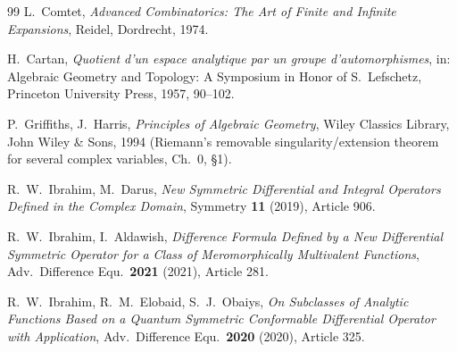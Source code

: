 \documentclass[11pt]{article}
\theoremstyle{remark}
\begin{document}
\begin{thebibliography}{99}
 L.\ Comtet, \emph{Advanced Combinatorics: The Art of Finite and Infinite Expansions}, Reidel, Dordrecht, 1974.

 H.\ Cartan, \emph{Quotient d'un espace analytique par un groupe d'automorphismes}, in: Algebraic Geometry and Topology: A Symposium in Honor of S.\ Lefschetz, Princeton University Press, 1957, 90--102.

 P.\ Griffiths, J.\ Harris, \emph{Principles of Algebraic Geometry}, Wiley Classics Library, John Wiley \& Sons, 1994 (Riemann's removable singularity/extension theorem for several complex variables, Ch.~0, \S1).

 R.\ W.\ Ibrahim, M.\ Darus, \emph{New Symmetric Differential and Integral Operators Defined in the Complex Domain}, Symmetry \textbf{11} (2019), Article 906.

 R.\ W.\ Ibrahim, I.\ Aldawish, \emph{Difference Formula Defined by a New Differential Symmetric Operator for a Class of Meromorphically Multivalent Functions}, Adv.\ Difference Equ.\ \textbf{2021} (2021), Article 281.

 R.\ W.\ Ibrahim, R.\ M.\ Elobaid, S.\ J.\ Obaiys, \emph{On Subclasses of Analytic Functions Based on a Quantum Symmetric Conformable Differential Operator with Application}, Adv.\ Difference Equ.\ \textbf{2020} (2020), Article 325.

\end{thebibliography}
\end{document}
